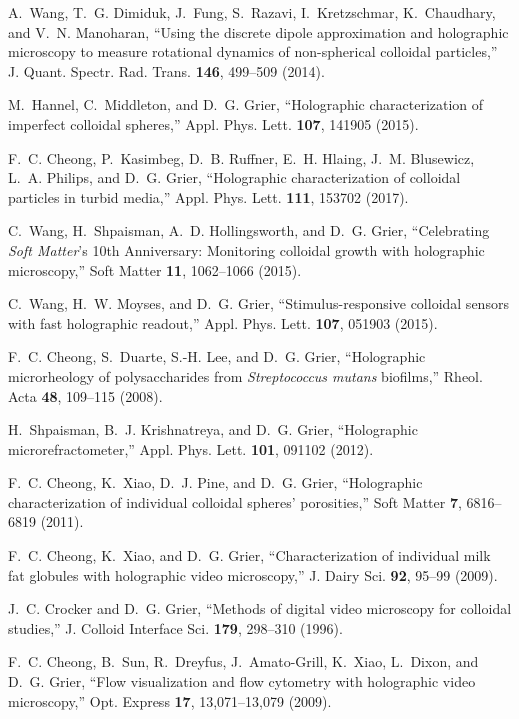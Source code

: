 \documentclass[10pt,letterpaper]{article}
\begin{document}
\begin{thebibliography}{10}
A.~Wang, T.~G. Dimiduk, J.~Fung, S.~Razavi, I.~Kretzschmar, K.~Chaudhary, and
  V.~N. Manoharan, \enquote{Using the discrete dipole approximation and
  holographic microscopy to measure rotational dynamics of non-spherical
  colloidal particles,} J. Quant. Spectr. Rad. Trans. \textbf{146}, 499--509
  (2014).

M.~Hannel, C.~Middleton, and D.~G. Grier, \enquote{Holographic characterization
  of imperfect colloidal spheres,} Appl. Phys. Lett. \textbf{107}, 141905
  (2015).

F.~C. Cheong, P.~Kasimbeg, D.~B. Ruffner, E.~H. Hlaing, J.~M. Blusewicz, L.~A.
  Philips, and D.~G. Grier, \enquote{Holographic characterization of colloidal
  particles in turbid media,} Appl. Phys. Lett. \textbf{111}, 153702 (2017).

C.~Wang, H.~Shpaisman, A.~D. Hollingsworth, and D.~G. Grier,
  \enquote{Celebrating \emph{Soft Matter}'s 10th Anniversary: Monitoring
  colloidal growth with holographic microscopy,} Soft Matter \textbf{11},
  1062--1066 (2015).

C.~Wang, H.~W. Moyses, and D.~G. Grier, \enquote{Stimulus-responsive colloidal
  sensors with fast holographic readout,} Appl. Phys. Lett. \textbf{107},
  051903 (2015).

F.~C. Cheong, S.~Duarte, S.-H. Lee, and D.~G. Grier, \enquote{Holographic
  microrheology of polysaccharides from \emph{Streptococcus mutans} biofilms,}
  Rheol. Acta \textbf{48}, 109--115 (2008).

H.~Shpaisman, B.~J. Krishnatreya, and D.~G. Grier, \enquote{Holographic
  microrefractometer,} Appl. Phys. Lett. \textbf{101}, 091102 (2012).

F.~C. Cheong, K.~Xiao, D.~J. Pine, and D.~G. Grier, \enquote{Holographic
  characterization of individual colloidal spheres' porosities,} Soft Matter
  \textbf{7}, 6816--6819 (2011).

F.~C. Cheong, K.~Xiao, and D.~G. Grier, \enquote{Characterization of individual
  milk fat globules with holographic video microscopy,} J. Dairy Sci.
  \textbf{92}, 95--99 (2009).

J.~C. Crocker and D.~G. Grier, \enquote{Methods of digital video microscopy for
  colloidal studies,} J. Colloid Interface Sci. \textbf{179}, 298--310 (1996).

F.~C. Cheong, B.~Sun, R.~Dreyfus, J.~Amato-Grill, K.~Xiao, L.~Dixon, and D.~G.
  Grier, \enquote{Flow visualization and flow cytometry with holographic video
  microscopy,} Opt. Express \textbf{17}, 13,071--13,079 (2009).


\end{thebibliography}
\end{document}

